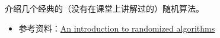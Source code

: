 \documentclass[a4paper, justified]{tufte-handout}
\begin{document}


\begin{ot}[经典随机算法介绍.]
	介绍几个经典的（没有在课堂上讲解过的）随机算法。
	\begin{itemize}
	\item 参考资料：\href{https://immorlica.com/randAlg/Karp91.pdf}{An introduction to randomized algorithms}
	\end{itemize}
\end{ot}


% 




\beginfb

% 
% 
\end{document}
